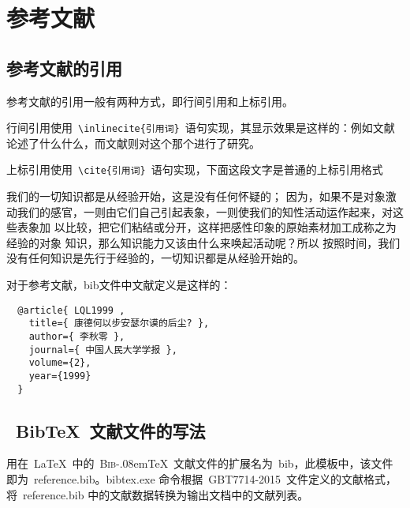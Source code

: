 
%
%
%

\chapter{参考文献}
\label{chap07}

\section{参考文献的引用}

参考文献的引用一般有两种方式，即行间引用和上标引用。

行间引用使用~\verb|\inlinecite{引用词}|~语句实现，其显示效果是这样的：例如文献论述了什么什么，而文献则对这个那个进行了研究。

上标引用使用~\verb|\cite{引用词}|~语句实现，下面这段文字是普通的上标引用格式

我们的一切知识都是从经验开始\cite{LQL1999}，这是没有任何怀疑的\cite{DXM2005}\cite{DXM2000}；
因为，如果不是对象激动我们的感官，一则由它们自己引起表象，一则使我们的知性活动运作起来，对这些表象加
以比较，把它们粘结或分开\cite{OJP1999,OJP1991}，这样把感性印象的原始素材加工成称之为经验的对象
知识，那么知识能力又该由什么来唤起活动呢\cite{braun2007,kelton2002,strawderman2001,LQL1999}？所以
按照时间，我们没有任何知识是先行于经验的，一切知识都是从经验开始的。

对于\cite{DXM2005}参考文献\cite{OJP1999}，bib文件中文献定义是这样的：
\begin{lstlisting}
  @article{ LQL1999 ,
    title={ 康德何以步安瑟尔谟的后尘? },
    author={ 李秋零 },
    journal={ 中国人民大学学报 },
    volume={2},
    year={1999}
  }
\end{lstlisting}

\section{~BibTeX~文献文件的写法}

用在~\LaTeX~中的~\textsc{Bib}\kern-.08em\TeX~文献文件的扩展名为~bib，此模板中，该文件即为~reference.bib。bibtex.exe 命令根据~GBT7714-2015~文件定义的文献格式，将~reference.bib 中的文献数据转换为输出文档中的文献列表。

